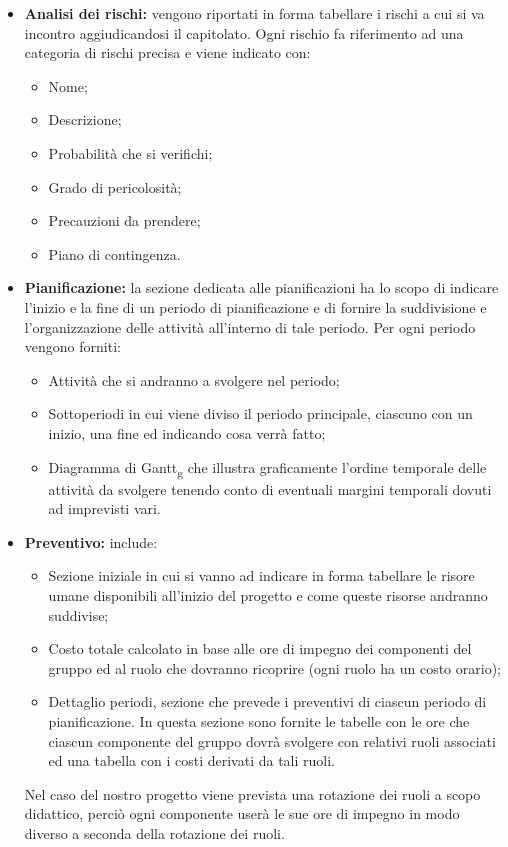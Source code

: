 \begin{itemize}
\item \textbf{Analisi dei rischi:} vengono riportati in forma tabellare i rischi a cui si va incontro aggiudicandosi il capitolato.
Ogni rischio fa riferimento ad una categoria di rischi precisa e viene indicato con:
\begin{itemize}
    \item Nome;
    \item Descrizione;
    \item Probabilità che si verifichi;
    \item Grado di pericolosità;
    \item Precauzioni da prendere;
    \item Piano di contingenza.
\end{itemize}
\item \textbf{Pianificazione:} la sezione dedicata alle pianificazioni ha lo scopo di indicare l'inizio e la fine di un periodo di pianificazione e 
di fornire la suddivisione e l'organizzazione delle attività all'interno di tale periodo. Per ogni periodo vengono forniti:
\begin{itemize}
    \item Attività che si andranno a svolgere nel periodo;
    \item Sottoperiodi in cui viene diviso il periodo principale, ciascuno con un inizio, una fine ed indicando cosa verrà fatto;
    \item Diagramma di Gantt\textsubscript{g} che illustra graficamente l'ordine temporale delle attività da svolgere tenendo conto di 
    eventuali margini temporali dovuti ad imprevisti vari.
\end{itemize}

\item \textbf{Preventivo:} include: 
\begin{itemize}
    \item Sezione iniziale in cui si vanno ad indicare in forma tabellare le risore umane disponibili all'inizio del progetto e 
    come queste risorse andranno suddivise;
    \item Costo totale calcolato in base alle ore di impegno dei componenti del gruppo ed al ruolo che dovranno ricoprire (ogni ruolo ha un costo orario);
    \item Dettaglio periodi, sezione che prevede i preventivi di ciascun periodo di pianificazione.
    In questa sezione sono fornite le tabelle con le ore che ciascun componente del gruppo dovrà svolgere con relativi ruoli associati ed una tabella con i costi
    derivati da tali ruoli.
\end{itemize}
Nel caso del nostro progetto viene prevista una rotazione dei ruoli a scopo didattico, perciò ogni componente userà le sue ore di impegno in modo diverso 
a seconda della rotazione dei ruoli.
\end{itemize}